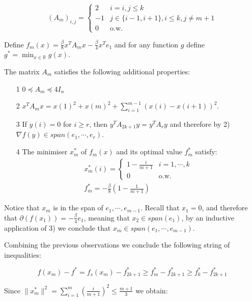 \begin{equation}
(A_m)_{i,j} = \begin{cases}
                2  &  i = i,j \leq k \\
                -1 &  j \in \{i-1, i+1\}, i \leq k, j \neq m+1\\
                0 & \text{o.w.}
            \end{cases}
\end{equation}

 
Define $f_m(x) = \frac{\beta}{8} x^T A_m x - \frac{\beta}{4}x^Te_1$ and for any function $g$ define $g^* = \min_{x \in \mathbb{R}} g(x)$.

The matrix $A_m$ satisfies the following additional properties:
\begin{itemize}
\item[1] $0 \preceq A_m \preceq 4I_n$
\item[2] $x^TA_mx = x(1)^2 + x(m)^2 + \sum_{i=1}^{m-1} (x(i)-x(i+1))^2$.
\item[3] If $y(i) = 0$ for $i \geq r$, then $y^T A_{2k+1} y = y^TA_{r}y$ and therefore by 2) $\nabla f(y) \in span(e_1, \cdots, e_{r})$. 
\item[4] The minimiser $x_m^*$ of $f_m(x)$ and its optimal value $f_m^*$ satisfy:
    \begin{align}
        x_m^*(i) = \begin{cases}
                    1-\frac{i}{m+1} & i = 1, \cdots, k \\
                    0 & \text{o.w.}
                    \end{cases}\\
        f_m^* = -\frac{\beta}{8}\left( 1-\frac{1}{m+1}\right)
    \end{align}
\end{itemize}


Notice that $x_m$ is in the span of $e_1, \cdots, e_{m-1}$.  Recall that $x_1 = 0$, and therefore that $\partial(f(x_1)) = -\frac{\beta}{4}e_1$, meaning that $x_2 \in span(e_1)$, by an inductive application of 3) we conclude that $x_m \in span(e_1, \cdots, e_{m-1})$. 

Combining the previous observations we conclude the following string of inequalities:


\begin{equation}
f(x_m) - f^* = f_s(x_m) - f_{2k+1}^* \geq f_m^* - f^*_{2k+1} \geq f_k^* - f_{2k+1}^*
\end{equation}

Since $\parallel x_m^* \parallel^2 = \sum_{i=1}^m \left( \frac{i}{m+1}\right)^2 \leq \frac{m+1}{3}$ we obtain:

